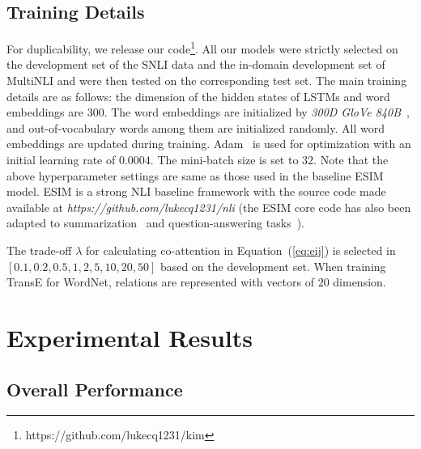 \documentclass[11pt,a4paper]{article}
\begin{document}
\subsection{Training Details}
For duplicability, we release our code\footnote{https://github.com/lukecq1231/kim}. All our models were strictly selected on the development set of the SNLI data and the in-domain development set of MultiNLI and were then tested on the corresponding test set. The main training details are as follows: the dimension of the hidden states of LSTMs and word embeddings are $300$. The word embeddings are initialized by \textit{300D GloVe 840B}~\citep{DBLP:conf/emnlp/PenningtonSM14}, and out-of-vocabulary words among them are initialized randomly. All word embeddings are updated during training. Adam~\citep{DBLP:journals/corr/KingmaB14} is used for optimization with an initial learning rate of $0.0004$. The mini-batch size is set to $32$. Note that the above hyperparameter settings are same as those used in the baseline ESIM~\citep{DBLP:conf/acl/ChenZLWJI17} model. ESIM is a strong NLI baseline framework with the source code made available at \textit{https://github.com/lukecq1231/nli} (the ESIM core code has also been adapted to summarization~\citep{DBLP:conf/ijcai/ChenZLWJ16} and question-answering tasks~\citep{Zhang:qa:2017}). 

The trade-off $\lambda$ for calculating co-attention in Equation~(\ref{eq:eij}) is selected in $[0.1, 0.2, 0.5, 1, 2, 5, 10, 20, 50]$ based on the development set. When training TransE for WordNet, relations are represented with vectors of $20$ dimension.

\section{Experimental Results}
\label{sec:res}
\subsection{Overall Performance} 
\end{document}
